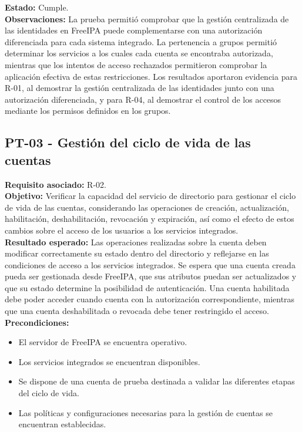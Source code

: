 \textbf{Estado:} Cumple.\\
\textbf{Observaciones:} La prueba permitió comprobar que la gestión centralizada de las identidades en FreeIPA puede complementarse con una autorización diferenciada para cada sistema integrado. La pertenencia a grupos permitió determinar los servicios a los cuales cada cuenta se encontraba autorizada, mientras que los intentos de acceso rechazados permitieron comprobar la aplicación efectiva de estas restricciones.
Los resultados aportaron evidencia para R-01, al demostrar la gestión centralizada de las identidades junto con una autorización diferenciada, y para R-04, al demostrar el control de los accesos mediante los permisos definidos en los grupos.

\subsection{PT-03 - Gestión del ciclo de vida de las cuentas}\label{subsec:pt03}
\textbf{Requisito asociado:} R-02.\\
\textbf{Objetivo:} Verificar la capacidad del servicio de directorio para gestionar el ciclo de vida de las cuentas, considerando las operaciones de creación, actualización, habilitación, deshabilitación, revocación y expiración, así como el efecto de estos cambios sobre el acceso de los usuarios a los servicios integrados.\\
\textbf{Resultado esperado:} Las operaciones realizadas sobre la cuenta deben modificar correctamente su estado dentro del directorio y reflejarse en las condiciones de acceso a los servicios integrados.
Se espera que una cuenta creada pueda ser gestionada desde FreeIPA, que sus atributos puedan ser actualizados y que su estado determine la posibilidad de autenticación. Una cuenta habilitada debe poder acceder cuando cuenta con la autorización correspondiente, mientras que una cuenta deshabilitada o revocada debe tener restringido el acceso.\\
\textbf{Precondiciones:}
\begin{itemize}
	\item El servidor de FreeIPA se encuentra operativo.
	\item Los servicios integrados se encuentran disponibles.
	\item Se dispone de una cuenta de prueba destinada a validar las diferentes etapas del ciclo de vida.
	\item Las políticas y configuraciones necesarias para la gestión de cuentas se encuentran establecidas.
\end{itemize}
